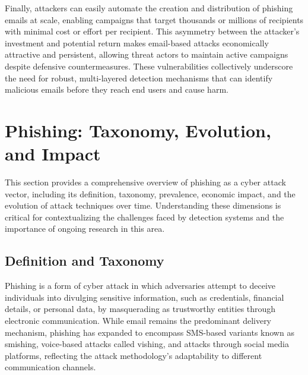 Finally, attackers can easily automate the creation and distribution of phishing emails at scale, enabling campaigns that target thousands or millions of recipients with minimal cost or effort per recipient. This asymmetry between the attacker's investment and potential return makes email-based attacks economically attractive and persistent, allowing threat actors to maintain active campaigns despite defensive countermeasures. These vulnerabilities collectively underscore the need for robust, multi-layered detection mechanisms that can identify malicious emails before they reach end users and cause harm.

\section{Phishing: Taxonomy, Evolution, and Impact}

This section provides a comprehensive overview of phishing as a cyber attack vector, including its definition, taxonomy, prevalence, economic impact, and the evolution of attack techniques over time. Understanding these dimensions is critical for contextualizing the challenges faced by detection systems and the importance of ongoing research in this area.

\subsection{Definition and Taxonomy}

Phishing is a form of cyber attack in which adversaries attempt to deceive individuals into divulging sensitive information, such as credentials, financial details, or personal data, by masquerading as trustworthy entities through electronic communication. While email remains the predominant delivery mechanism, phishing has expanded to encompass SMS-based variants known as smishing, voice-based attacks called vishing, and attacks through social media platforms, reflecting the attack methodology's adaptability to different communication channels.


